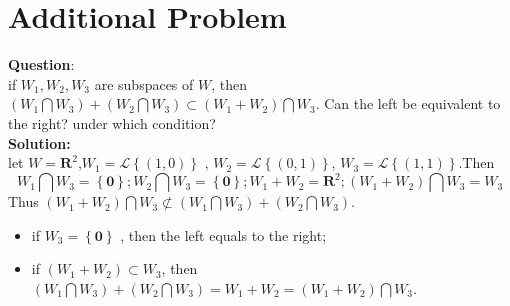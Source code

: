 \documentclass[12pt,a4paper]{article}
\begin{document}
\section{Additional Problem}
\textbf{Question}: \\
\indent if ${W}_1,{W}_2,{W}_3$ are subspaces of ${W}$, then 
$({W}_1 \bigcap {W}_3) + ({W}_2 \bigcap {W}_3) \subset ({W}_1 +{W}_2) \bigcap {W}_3$.
Can the left be equivalent to  the right? under which condition? \\
\textbf{Solution:} \\
\indent let $W = \mathbf{R}^{2}$,$W_1 = \mathcal{L}\left\lbrace (1,0) \right\rbrace$ ,
$W_2 = \mathcal{L}\left\lbrace (0,1)\right\rbrace$,
$W_3 = \mathcal{L}\left\lbrace (1,1)\right\rbrace  $.Then \\
\[
W_1 \bigcap W_3 = \left\lbrace \mathbf{0} \right\rbrace ;
W_2 \bigcap W_3 = \left\lbrace \mathbf{0} \right\rbrace ;
W_1 + W_2  = \mathbf{R}^{2};
(W_1 + W_2)\bigcap W_3  = W_3
\]
Thus $({W}_1 +{W}_2) \bigcap {W}_3
\not\subset 
({W}_1 \bigcap {W}_3) + ({W}_2 \bigcap {W}_3)$. \\
\begin{itemize}
	\item if $W_3 = \left\lbrace \mathbf{0}\right\rbrace $ , then the left equals to the right;  
	\item if $ (W_1 + W_2) \subset W_3 $, then $(W_1\bigcap W_3) + (W_2\bigcap W_3) = W_1 + W_2 = (W_1 + W_2)\bigcap W_3$.
\end{itemize}
 
\end{document}
